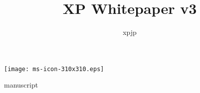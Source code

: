 \documentclass[a4j,12pt]{jsarticle}
\title {XP Whitepaper v3}
\author {xpjp}
\date {}
\begin{document}
\begin{center}
  \texttt{[image: ms-icon-310x310.eps]}
\end{center}
 {manuscript}
\end{document}
